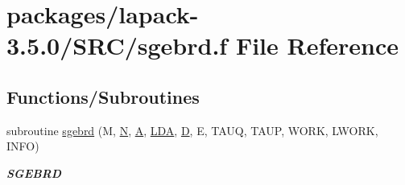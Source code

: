 \hypertarget{sgebrd_8f}{}\section{packages/lapack-\/3.5.0/\+S\+R\+C/sgebrd.f File Reference}
\label{sgebrd_8f}
\subsection*{Functions/\+Subroutines}
\begin{DoxyCompactItemize}
\item 
subroutine \hyperlink{group__realGEcomputational_gaa7ed93332ee7ff7ab268080a453615b6}{sgebrd} (M, \hyperlink{polmisc_8c_a0240ac851181b84ac374872dc5434ee4}{N}, \hyperlink{classA}{A}, \hyperlink{example__user_8c_ae946da542ce0db94dced19b2ecefd1aa}{L\+D\+A}, \hyperlink{odrpack_8h_a7dae6ea403d00f3687f24a874e67d139}{D}, E, T\+A\+U\+Q, T\+A\+U\+P, W\+O\+R\+K, L\+W\+O\+R\+K, I\+N\+F\+O)
\begin{DoxyCompactList}\small\item\em {\bfseries S\+G\+E\+B\+R\+D} \end{DoxyCompactList}\end{DoxyCompactItemize}
